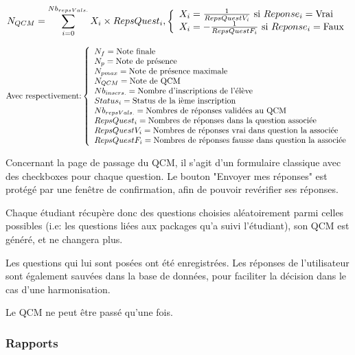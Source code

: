 \begin{equation}
    N_{QCM} = \sum_{i = 0}^{Nb_{repsVals.}} X_{i} \times RepsQuest_{i} {,}
    \left\{
    \begin{array}{l l}
        X_{i} = \frac{1}{RepsQuestV_{i}} \text{ si }Reponse_{i} = \text{Vrai}\\
        X_{i} = -\frac{1}{RepsQuestF_{i}} \text{ si }Reponse_{i} = \text{Faux}\\
    \end{array}
    \right.
\end{equation}

$$
\text{Avec respectivement:}
\left\{
\begin{array}{l l l l l l l l}
N_{f} = \text{Note finale}\\
N_{p} = \text{Note de présence}\\
N_{pmax} = \text{Note de présence maximale}\\
N_{QCM} = \text{Note de QCM}\\
Nb_{inscrs.} = \text{Nombre d'inscriptions de l'élève}\\
Status_{i} = \text{Status de la ième inscription}\\
Nb_{repsVals.} = \text{Nombres de réponses validées au QCM}\\
RepsQuest_{i} = \text{Nombres de réponses dans la question associée}\\
RepsQuestV_{i} = \text{Nombres de réponses vrai dans question la associée}\\
RepsQuestF_{i} = \text{Nombres de réponses fausse dans question la associée}\\
\end{array}
\right.
$$

Concernant la page de passage du QCM, il s'agit d'un formulaire classique avec des checkboxes pour chaque question.
Le bouton "Envoyer mes réponses" est protégé par une fenêtre de confirmation, afin de pouvoir revérifier ses réponses.

Chaque étudiant récupère donc des questions choisies aléatoirement parmi celles possibles (i.e: les questions liées aux packages qu'a
suivi l'étudiant), son QCM est généré, et ne changera plus.

Les questions qui lui sont posées ont été enregistrées. Les réponses de l'utilisateur sont également sauvées dans la base de données,
pour faciliter la décision dans le cas d'une harmonisation.

Le QCM ne peut être passé qu'une fois.

            \subsubsection{Rapports}

